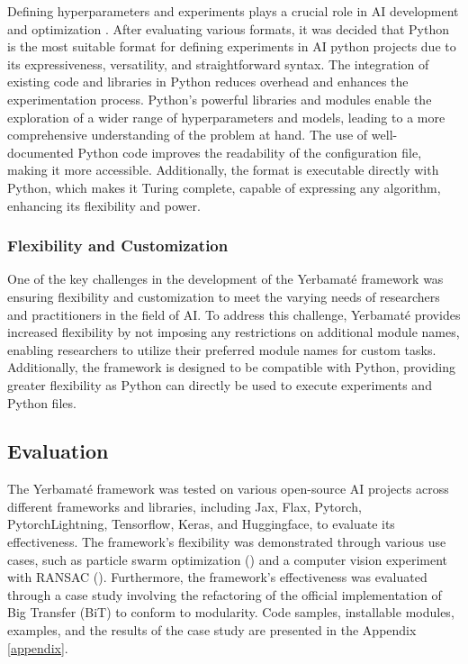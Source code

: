 Defining hyperparameters and experiments plays a crucial role in AI development and optimization \cite{wu2019hyperparameter}. After evaluating various formats, it was decided that Python is the most suitable format for defining experiments in AI python projects due to its expressiveness, versatility, and straightforward syntax. The integration of existing code and libraries in Python reduces overhead and enhances the experimentation process. Python's powerful libraries and modules enable the exploration of a wider range of hyperparameters and models, leading to a more comprehensive understanding of the problem at hand. The use of well-documented Python code improves the readability of the configuration file, making it more accessible. Additionally, the format is executable directly with Python, which makes it Turing complete, capable of expressing any algorithm, enhancing its flexibility and power.


\subsubsection{Flexibility and Customization}

One of the key challenges in the development of the Yerbamaté framework was ensuring flexibility and customization to meet the varying needs of researchers and practitioners in the field of AI. To address this challenge, Yerbamaté provides increased flexibility by not imposing any restrictions on additional module names, enabling researchers to utilize their preferred module names for custom tasks. Additionally, the framework is designed to be compatible with Python, providing greater flexibility as Python can directly be used to execute experiments and Python files.

\subsection{Evaluation}

The Yerbamaté framework was tested on various open-source AI projects across different frameworks and libraries, including Jax, Flax, Pytorch, Pytorch\-Lightning, Tensorflow, Keras, and Huggingface, to evaluate its effectiveness. The framework's flexibility was demonstrated through various use cases, such as particle swarm optimization (\cite{kennedy1995particle}) and a computer vision experiment with RANSAC (\cite{lowe2004distinctive}). Furthermore, the framework's effectiveness was evaluated through a case study involving the refactoring of the official implementation of Big Transfer (BiT) to conform to modularity. Code samples, installable modules, examples, and the results of the case study are presented in the Appendix \ref{appendix}.
